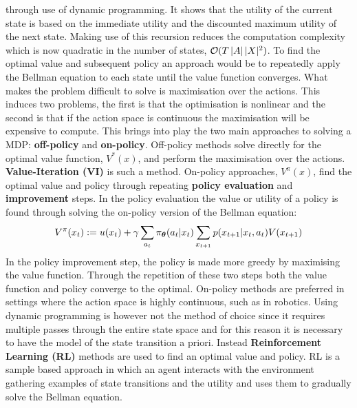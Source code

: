 through use of dynamic programming. It shows that the utility of the current state is based on the immediate utility and 
the discounted maximum utility of the next state. Making use of this recursion reduces the computation complexity which is now 
quadratic in the number of states, $\operatorname{\mathcal{O}}(T\, |A|\, |X|^2)$. To find the optimal value and subsequent policy an approach 
would be to repeatedly apply the Bellman equation to each state until the value function converges. What makes the problem 
difficult to solve is maximisation over the actions. This induces two problems, the first is that the optimisation is nonlinear 
and the second is that if the action space is continuous the maximisation will be expensive to compute.
This brings into play the two main approaches to solving a MDP: \textbf{off-policy} and \textbf{on-policy}.
Off-policy methods solve directly for the optimal value function, $V^*(x)$, and perform the maximisation over the actions. \textbf{Value-Iteration (VI)}
is such a method. On-policy approaches, $V^{\pi}(x)$, find the optimal value and policy through repeating \textbf{policy evaluation} and
\textbf{improvement} steps. In the policy evaluation the value or utility of a policy is found through solving the on-policy version of the Bellman 
equation:
\begin{equation}\label{eq:on_policy_bellman}
  V^{\pi}(x_t) := u(x_t) + \gamma \sum\limits_{a_t} \operatorname{\pi_{\boldsymbol{\theta}}}(a_t|x_t) \sum\limits_{x_{t+1}} p(x_{t+1}|x_t,a_t) V(x_{t+1})
\end{equation}
In the policy improvement step, the policy is made more greedy by maximising the value function. Through the repetition of these two 
steps both the value function and policy converge to the optimal. On-policy methods are preferred in settings where the action 
space is highly continuous, such as in robotics. Using dynamic programming is however not the method of choice since it requires 
multiple passes through the entire state space and for this reason it is necessary to have the model of the state transition a priori. 
Instead \textbf{Reinforcement Learning (RL)} methods are used to find an optimal value and policy. RL is a sample based approach
in which an agent interacts with the environment gathering examples of state transitions and the utility and uses them 
to gradually solve the Bellman equation.

